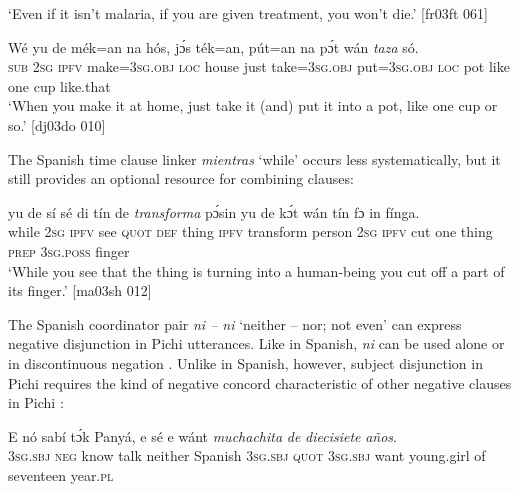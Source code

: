 \glt ‘Even if it isn’t malaria, if you are given treatment, you won’t die.’ [fr03ft 061]
\z


\ea%
    \label{ex:key:1728}
    \gll Wé  yu  de  mék=an    na  hós,    jɔ́s  ték=an,
pút=an    na  pɔ́t    wán    \textit{taza}  só.\\
\textsc{sub}  \textsc{2sg}  \textsc{ipfv}  make=\textsc{3sg.obj}  \textsc{loc}  house  just  take=\textsc{3sg.obj}
put=\textsc{3sg.obj}  \textsc{loc}  pot  like    one    cup  like.that\\

\glt ‘When you make it at home, just take it (and) put it into a pot, 
like one cup or so.’ [dj03do 010]
\z

The Spanish time clause linker \textit{mientras} ‘while’ occurs less systematically, but it still provides an optional resource for combining clauses: 


\ea%
    \label{ex:key:1729}
    \gll {}    yu  de  sí  sé  di  tín    de  \textit{transforma}  pɔ́sin
yu  de  kɔ́t  wán    tín    fɔ  in    fínga.\\
while    \textsc{2sg}  \textsc{ipfv}  see  \textsc{quot}  \textsc{def}  thing  \textsc{ipfv}  transform  person
\textsc{2sg}  \textsc{ipfv}  cut  one    thing  \textsc{prep}  \textsc{3sg.poss}  finger\\

\glt ‘While you see that the thing is turning into a human-being you cut 
off a part of its finger.’ [ma03sh 012]
\z

The Spanish coordinator pair \textit{ni – ni} ‘neither – nor; not even’ can express negative disjunction in Pichi utterances. Like in Spanish, \textit{ni} can be used alone  or in discontinuous negation . Unlike in Spanish, however, subject disjunction in Pichi requires the kind of negative concord characteristic of other negative clauses in Pichi : 


\ea%
    \label{ex:key:1730}
    \gll E    nó  sabí    tɔ́k      Panyá,  e    sé
e    wánt  \textit{muchachita}  \textit{de}  \textit{diecisiete}    \textit{años}.\\
\textsc{3sg.sbj}  \textsc{neg}  know  talk  neither  Spanish  \textsc{3sg.sbj}  \textsc{quot}  
\textsc{3sg.sbj}  want  young.girl  of  seventeen  year.\textsc{pl}\\

